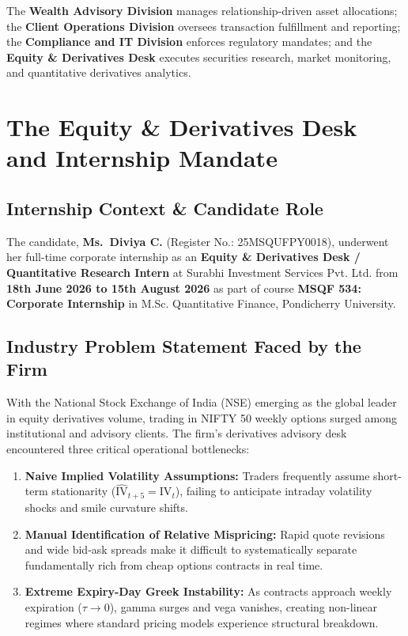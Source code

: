 The \textbf{Wealth Advisory Division} manages relationship-driven asset allocations; the \textbf{Client Operations Division} oversees transaction fulfillment and reporting; the \textbf{Compliance and IT Division} enforces regulatory mandates; and the \textbf{Equity \& Derivatives Desk} executes securities research, market monitoring, and quantitative derivatives analytics.

\section{The Equity \& Derivatives Desk and Internship Mandate}

\subsection{Internship Context \& Candidate Role}
The candidate, \textbf{Ms.~Diviya C.} (Register No.: 25MSQUFPY0018), underwent her full-time corporate internship as an \textbf{Equity \& Derivatives Desk / Quantitative Research Intern} at Surabhi Investment Services Pvt. Ltd. from \textbf{18th June 2026 to 15th August 2026} as part of course \textbf{MSQF 534: Corporate Internship} in M.Sc. Quantitative Finance, Pondicherry University.

\subsection{Industry Problem Statement Faced by the Firm}
With the National Stock Exchange of India (NSE) emerging as the global leader in equity derivatives volume, trading in NIFTY 50 weekly options surged among institutional and advisory clients. The firm's derivatives advisory desk encountered three critical operational bottlenecks:
\begin{enumerate}\setlength{\itemsep}{0pt}\setlength{\parskip}{0pt}
    \item \textbf{Naive Implied Volatility Assumptions:} Traders frequently assume short-term stationarity ($\widehat{\text{IV}}_{t+5} = \text{IV}_t$), failing to anticipate intraday volatility shocks and smile curvature shifts.
    \item \textbf{Manual Identification of Relative Mispricing:} Rapid quote revisions and wide bid-ask spreads make it difficult to systematically separate fundamentally rich from cheap options contracts in real time.
    \item \textbf{Extreme Expiry-Day Greek Instability:} As contracts approach weekly expiration ($\tau \to 0$), gamma surges and vega vanishes, creating non-linear regimes where standard pricing models experience structural breakdown.
\end{enumerate}

